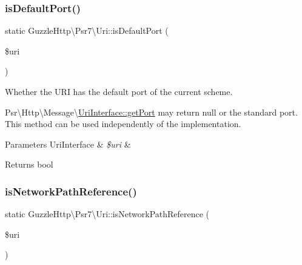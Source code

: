 \subsubsection{\texorpdfstring{is\+Default\+Port()}{isDefaultPort()}}
{\footnotesize\ttfamily static Guzzle\+Http\textbackslash{}\+Psr7\textbackslash{}\+Uri\+::is\+Default\+Port (\begin{DoxyParamCaption}\item[{\hyperlink{interfacePsr_1_1Http_1_1Message_1_1UriInterface}{Uri\+Interface}}]{\$uri }\end{DoxyParamCaption})\hspace{0.3cm}{\ttfamily [static]}}

Whether the U\+RI has the default port of the current scheme.

{\ttfamily Psr\textbackslash{}Http\textbackslash{}Message\textbackslash{}\hyperlink{interfacePsr_1_1Http_1_1Message_1_1UriInterface_aa6738a90dce8e99c3b0fc6a73f34cd62}{Uri\+Interface\+::get\+Port}} may return null or the standard port. This method can be used independently of the implementation.


\begin{DoxyParams}[1]{Parameters}
Uri\+Interface & {\em \$uri} & \\
\hline
\end{DoxyParams}
\begin{DoxyReturn}{Returns}
bool 
\end{DoxyReturn}
\mbox{\label{classGuzzleHttp_1_1Psr7_1_1Uri_ad1c4e868c38ac77b124c979cca3ae4e0}} 
\subsubsection{\texorpdfstring{is\+Network\+Path\+Reference()}{isNetworkPathReference()}}
{\footnotesize\ttfamily static Guzzle\+Http\textbackslash{}\+Psr7\textbackslash{}\+Uri\+::is\+Network\+Path\+Reference (\begin{DoxyParamCaption}\item[{\hyperlink{interfacePsr_1_1Http_1_1Message_1_1UriInterface}{Uri\+Interface}}]{\$uri }\end{DoxyParamCaption})\hspace{0.3cm}{\ttfamily [static]}}

